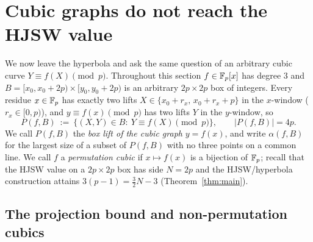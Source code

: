 %

\section{Cubic graphs do not reach the HJSW value}\label{sec:cubic}

We now leave the hyperbola and ask the same question of an arbitrary cubic curve $Y\equiv f(X)\pmod p$. Throughout
this section $f\in\mathbb{F}_p[x]$ has degree $3$ and $B=[x_0,x_0+2p)\times[y_0,y_0+2p)$ is an arbitrary $2p\times2p$ box of
integers. Every residue $x\in\mathbb{F}_p$ has exactly two lifts $X\in\{x_0+r_x,\,x_0+r_x+p\}$ in the $x$-window
($r_x\in[0,p)$), and $y\equiv f(x)\pmod p$ has two lifts $Y$ in the $y$-window, so
\[
P(f,B)\ :=\ \{(X,Y)\in B:\ Y\equiv f(X)\pmod p\},\qquad |P(f,B)|=4p .
\]
We call $P(f,B)$ the \emph{box lift of the cubic graph} $y=f(x)$, and write $\alpha(f,B)$ for the largest size of a
subset of $P(f,B)$ with no three points on a common line. We call $f$ a
\emph{permutation cubic} if $x\mapsto f(x)$ is a bijection of $\mathbb{F}_p$; recall that the HJSW value on a $2p\times2p$
box has side $N=2p$ and the HJSW/hyperbola construction attains $3(p-1)=\tfrac32N-3$ (Theorem~\ref{thm:main}).

\subsection*{The projection bound and non-permutation cubics}

